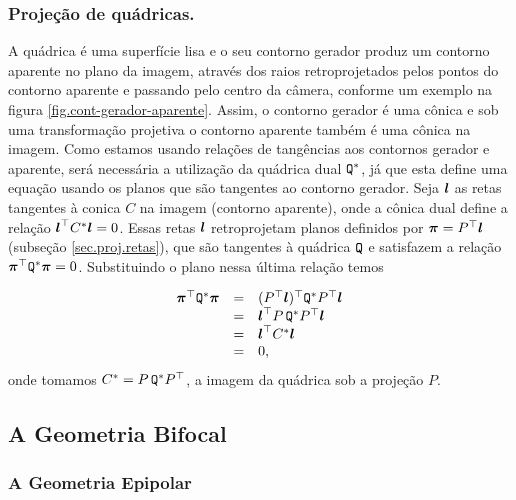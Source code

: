 \subsubsection*{Projeção de quádricas.}
A quádrica é uma superfície lisa  e o seu contorno gerador produz um contorno aparente no plano da imagem, através dos raios retroprojetados pelos pontos do contorno aparente e passando pelo centro da câmera, conforme um exemplo na figura \ref{fig.cont-gerador-aparente}. Assim, o contorno gerador é uma cônica e sob uma transformação projetiva o contorno aparente também é uma cônica na imagem. Como estamos usando relações de tangências aos contornos gerador e aparente, será necessária a utilização da quádrica dual	${\tt Q}^*$, já que esta define uma equação usando os planos que são tangentes ao contorno gerador. Seja $\boldsymbol{l}$ as retas tangentes à conica $C$ na imagem (contorno aparente), onde a cônica dual define a relação $\boldsymbol{l}^\top C^*\boldsymbol{l}=0$. Essas retas $\boldsymbol{l}$ retroprojetam planos definidos por $\boldsymbol{\pi}=P^\top\boldsymbol{l}$ (subseção \ref{sec.proj.retas}), que são tangentes à quádrica ${\tt Q}$ e satisfazem a relação $\boldsymbol{\pi}^\top {\tt Q}^*\boldsymbol{\pi}=0$. Substituindo o plano nessa última relação temos

\begin{equation*}
\begin{array}{rcl}
\boldsymbol{\pi}^\top {\tt Q}^*\boldsymbol{\pi}&=&(P^\top\boldsymbol{l})^\top {\tt Q}^*P^\top\boldsymbol{l}\\
&=&\boldsymbol{l}^\top P\,{\tt Q}^*P^\top\boldsymbol{l}\\
&=&\boldsymbol{l}^\top C^*\boldsymbol{l}\\
&=&0,
\end{array}
\end{equation*}
onde tomamos $C^*=P\,{\tt Q}^*P^\top$, a imagem da quádrica sob a projeção $P$.

\subsection{A Geometria Bifocal}

\subsubsection{A Geometria Epipolar}

